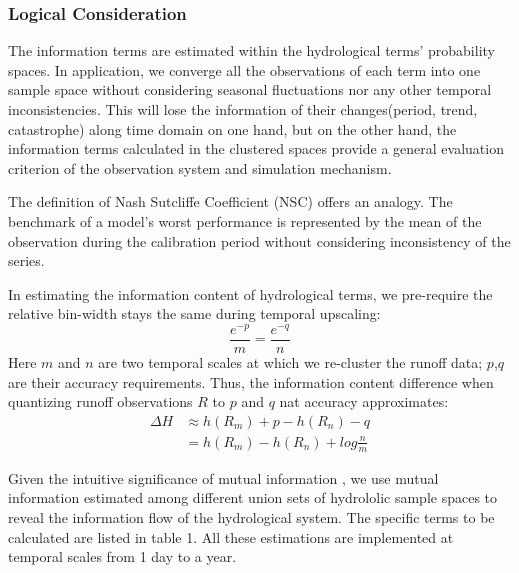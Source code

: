 \documentclass[11pt]{article}
\begin{document}
\subsubsection{Logical Consideration}


The information terms are estimated within the hydrological terms' probability  spaces. In application, we converge all the observations of each term into one sample space without considering seasonal fluctuations nor any other temporal inconsistencies. This will lose the information of their changes(period, trend, catastrophe) along time domain on one hand, but on the other hand, the information terms calculated in the clustered spaces provide a general evaluation criterion of the observation system and simulation mechanism.

The definition of Nash Sutcliffe Coefficient (NSC)\cite{nash1970river} offers an analogy. The  benchmark of a model's worst performance is represented by the mean of the observation during the calibration period without considering inconsistency of the series.


In estimating the information content of hydrological terms,
we pre-require the relative bin-width stays the same  during temporal upscaling:
\begin{equation}
\frac{e^{-p}}{m}=\frac{e^{-q}}{n}
\end{equation}
Here $m$ and $n$ are two temporal scales at which we re-cluster the runoff data; $p$,$q$ are their accuracy requirements. Thus, the information content difference when quantizing runoff observations $R$ to $p$ and $q$ nat accuracy approximates:
\begin{equation}
\begin{split}
\Delta H &\approx h(R_m)+p-h(R_n)-q\\
&=h(R_m)-h(R_n)+log\frac{n}{m} 
\end{split}
\end{equation}

Given the intuitive significance of mutual information 
, we use mutual information estimated among different union sets of hydrololic sample spaces to reveal the information flow of the hydrological system. The specific terms to be calculated are listed in table 1. All these estimations are implemented at temporal scales from 1 day to a year. %
\end{document}

